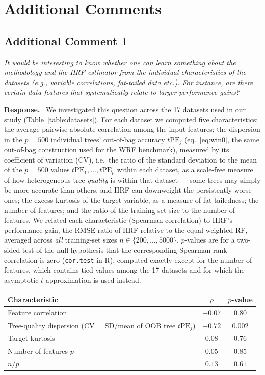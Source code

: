 \documentclass[12pt]{article}
\newcommand{\comment}[1]{\begin{refbox}\textit{#1}\end{refbox}}
\newcommand{\response}{\medskip\noindent\textbf{Response.}\ }
\begin{document}
\section*{Additional Comments}

\subsection*{Additional Comment 1}

\comment{It would be interesting to know whether one can learn something about
the methodology and the HRF estimator from the individual characteristics of
the datasets (e.g., variable correlations, fat-tailed data etc.).  For
instance, are there certain data features that systematically relate to larger
performance gains?}

\response
We investigated this question across the 17 datasets used in our study
(Table~\ref{table:datasets}). For each dataset we computed five
characteristics: the average pairwise absolute correlation among the
input features; the dispersion in the $p = 500$ individual trees' out-of-bag accuracy
$t\mbox{PE}_j$ (eq.~\eqref{eq:win0}, the same out-of-bag construction
used for the WRF benchmark), measured by its coefficient of variation
(CV), i.e.\ the ratio of the standard deviation to the mean of the
$p = 500$ values $t\mbox{PE}_1, \ldots, t\mbox{PE}_p$ within each
dataset, as a scale-free measure of how heterogeneous tree
\emph{quality} is within that dataset --- some trees may simply be
more accurate than others, and HRF can downweight the persistently
worse ones; the
excess kurtosis of the target variable, as a measure of fat-tailedness;
the number of features; and the ratio of the training-set size to the
number of features. We related each
characteristic (Spearman correlation) to HRF's performance gain, the
RMSE ratio of HRF relative to the equal-weighted RF, averaged across
\emph{all} training-set sizes $n \in \{200, \ldots, 5000\}$. $p$-values
are for a two-sided test of the null hypothesis that the corresponding
Spearman rank correlation is zero (\texttt{cor.test} in R), computed
exactly except for the number of features, which contains tied values
among the 17 datasets and for which the asymptotic $t$-approximation is
used instead.

\medskip
\begin{center}
\begin{tabular}{lcc}
\toprule
Characteristic & $\rho$ & $p$-value \\
\midrule
Feature correlation & $-0.07$ & $0.80$ \\
Tree-quality dispersion (CV = SD/mean of OOB tree $t\mbox{PE}_j$) & $-0.72$ & $0.002$ \\
Target kurtosis & $0.08$ & $0.76$ \\
Number of features $p$ & $0.05$ & $0.85$ \\
$n / p$ & $0.13$ & $0.61$ \\
\bottomrule
\end{tabular}
\end{center}
\medskip
\end{document}
